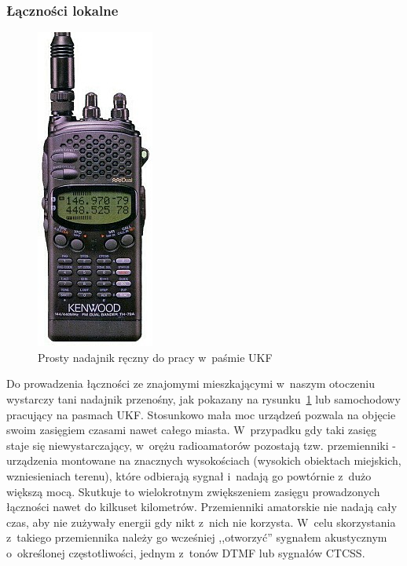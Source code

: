 \documentclass[]{mgr}
\begin{document}
                \subsubsection{Łączności lokalne}
                    \begin{figure}
                        \vspace{-20pt}
                        \begin{center}
                            \includegraphics[scale=0.55]{ukf_handheld}
                        \end{center}
                        \vspace{-20pt}
                        \caption{Prosty nadajnik ręczny do pracy w~paśmie UKF}
                        \vspace{-20pt}
                        \label{fig:ukf_handheld}
                    \end{figure}
                Do prowadzenia łączności ze znajomymi mieszkającymi w~naszym otoczeniu wystarczy tani nadajnik przenośny, jak pokazany na rysunku~\ref{fig:ukf_handheld} lub samochodowy pracujący na pasmach UKF. Stosunkowo mała moc urządzeń pozwala na objęcie swoim zasięgiem czasami nawet całego miasta. W~przypadku gdy taki zasięg staje się niewystarczający, w~orężu radioamatorów pozostają tzw. przemienniki - urządzenia montowane na znacznych wysokościach (wysokich obiektach miejskich, wzniesieniach terenu), które odbierają sygnał i~nadają go powtórnie z~dużo większą mocą. Skutkuje to wielokrotnym zwiększeniem zasięgu prowadzonych łączności nawet do kilkuset kilometrów. Przemienniki amatorskie nie nadają cały czas, aby nie zużywały energii gdy nikt z~nich nie korzysta. W~celu skorzystania z~takiego przemiennika należy go wcześniej ,,otworzyć'' sygnałem akustycznym o~określonej częstotliwości, jednym z~tonów DTMF lub sygnałów CTCSS.
\end{document}
